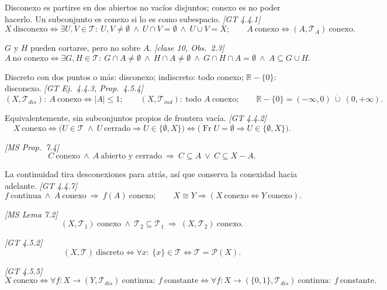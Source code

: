 \documentclass[11pt,a4paper]{article}
\theoremstyle{definition}
\theoremstyle{plain}
\newcommand{\fnt}[1]{{\normalfont\small\itshape\color{gray!150!black}[#1]}}
\newcommand{\R}{\mathbb{R}}
\newcommand{\fr}{\operatorname{Fr}}
\newcommand{\tp}{\mathcal{T}}
\begin{document}
\begin{itemize}[leftmargin=1.3em,itemsep=3pt]

 Disconexo es partirse en dos abiertos no vacíos disjuntos; conexo es no poder hacerlo. Un subconjunto es conexo si lo es como subespacio. \fnt{GT 4.4.1}
\[ X\ \text{disconexo}\iff \exists U,V\in\tp:\ U,V\ne\emptyset\ \wedge\ U\cap V=\emptyset\ \wedge\ U\cup V=X;\qquad A\ \text{conexo}\iff(A,\tp_A)\ \text{conexo}. \]

 $G$ y $H$ pueden cortarse, pero no sobre $A$. \fnt{clase 10, Obs.\ 2.3}
\[ A\ \text{no conexo}\iff \exists G,H\in\tp:\ G\cap A\ne\emptyset\ \wedge\ H\cap A\ne\emptyset\ \wedge\ G\cap H\cap A=\emptyset\ \wedge\ A\subseteq G\cup H. \]

 Discreto con dos puntos o más: disconexo; indiscreto: todo conexo; $\R-\{0\}$: disconexo. \fnt{GT Ej.\ 4.4.3, Prop.\ 4.5.4}
\[ (X,\tp_{dis}):\ A\ \text{conexo}\iff |A|\le1;\qquad (X,\tp_{ind}):\ \text{todo } A\ \text{conexo};\qquad \R-\{0\}=(-\infty,0)\ \dot\cup\ (0,+\infty). \]

 Equivalentemente, sin subconjuntos propios de frontera vacía. \fnt{GT 4.4.2}
\[ X\ \text{conexo}\iff \big(U\in\tp\ \wedge\ U\ \text{cerrado}\Rightarrow U\in\{\emptyset,X\}\big)\iff \big(\fr U=\emptyset\Rightarrow U\in\{\emptyset,X\}\big). \]

 \fnt{MS Prop.\ 7.4}
\[ C\ \text{conexo}\ \wedge\ A\ \text{abierto y cerrado}\ \Rightarrow\ C\subseteq A\ \vee\ C\subseteq X-A. \]

 La continuidad tira desconexiones para atrás, así que conserva la conexidad hacia adelante. \fnt{GT 4.4.7}
\[ f\ \text{continua}\ \wedge\ A\ \text{conexo}\ \Rightarrow\ f(A)\ \text{conexo};\qquad X\cong Y\Rightarrow(X\ \text{conexo}\iff Y\ \text{conexo}). \]

 \fnt{MS Lema 7.2}
\[ (X,\tp_1)\ \text{conexo}\ \wedge\ \tp_2\subseteq\tp_1\ \Rightarrow\ (X,\tp_2)\ \text{conexo}. \]

 \fnt{GT 4.5.2}
\[ (X,\tp)\ \text{discreto}\iff \forall x:\ \{x\}\in\tp\iff\tp=\mathcal P(X). \]

 \fnt{GT 4.5.5}
\[ X\ \text{conexo}\iff \forall f:X\to(Y,\tp_{dis})\ \text{continua}:\ f\ \text{constante}\iff \forall f:X\to(\{0,1\},\tp_{dis})\ \text{continua}:\ f\ \text{constante}. \]


\end{itemize}
\end{document}
